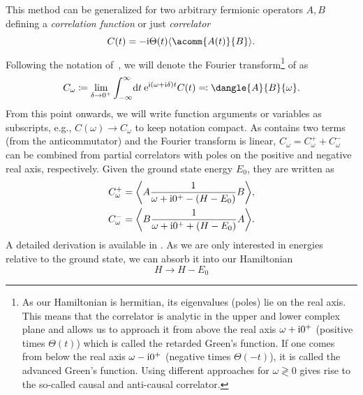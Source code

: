 This method can be generalized for two arbitrary fermionic operators $A, B$ defining
a \emph{correlation function} or just \emph{correlator}
\begin{equation}
    C(t) = -\mi \Theta(t) \expval{\acomm{A(t)}{B}}.
    \label{eq:correlator-time}
\end{equation}
Following the notation of~\cite{Bulla1998,Kugler2022},
we will denote the Fourier transform\footnote{
    As our Hamiltonian is hermitian, its eigenvalues (poles) lie on the real axis.
    This means that the correlator is analytic in the upper and lower complex plane
    and allows us to approach it
    from above the real axis $\omega + \mathrm{i} 0^+$ (positive times $\Theta(t)$)
    which is called the retarded Green's function.
    If one comes from below the real axis $\omega - \mathrm{i} 0^+$
    (negative times $\Theta(-t)$),
    it is called the advanced Green's function.
    Using different approaches for $\omega\gtrless0$ gives rise to the so-called
    causal and anti-causal correlator.
}
of  as
\begin{equation}
    C_\omega
    \coloneq
    \lim_{\delta\to0^+}
    \int_{-\infty}^\infty\! \md t\> \me^{\mi (\omega + \mi\delta) t} C(t)
    \eqcolon
    \dangle{A}{B}{\omega}.
\end{equation}
From this point onwards,
we will write function arguments or variables as subscripts, e.g.,
$C(\omega) \to C_\omega$ to keep notation compact.
As  contains two terms (from the anticommutator)
and the Fourier transform is linear,
$C_\omega = C^+_\omega + C^-_\omega$ can be combined from
partial correlators with poles on the positive and negative real axis,
respectively.
Given the ground state energy $E_0$,
they are written as
\begin{subequations}
    \begin{align}
        C^+_\omega
         & =
        \expval*{A \frac{1}{\omega + \mi0^+ - (H - E_0)} B}, \\
        C^-_\omega
         & =
        \expval*{B \frac{1}{\omega + \mi0^+ + (H - E_0)} A}.
    \end{align}%
    \label{eq:correlator-frequency}%
\end{subequations}
A detailed derivation is available in .
As we are only interested in energies relative to the ground state,
we can absorb it into our Hamiltonian
\begin{equation}
    H \to H - E_0
    \label{eq:Hamiltonian-shift}
\end{equation}
